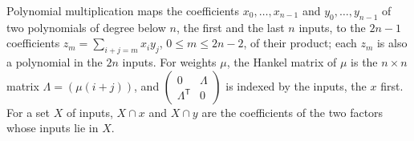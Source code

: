 \begin{definition}
  \label{def:lowerbounds-algebraic-poly-mul}
  \leanok
  Polynomial multiplication maps the coefficients $x_0,\dots,x_{n-1}$ and
  $y_0,\dots,y_{n-1}$ of two polynomials of degree below $n$, the first and
  the last $n$ inputs, to the $2n-1$ coefficients
  $z_m=\sum_{i+j=m}x_iy_j$, $0\le m\le 2n-2$, of their product; each $z_m$ is
  also a polynomial in the $2n$ inputs. For weights $\mu$, the Hankel matrix
  of $\mu$ is the $n\times n$ matrix $\Lambda=(\mu(i+j))$, and
  $\left(\begin{smallmatrix}0&\Lambda\\\Lambda^{\mathsf T}&0\end{smallmatrix}\right)$
  is indexed by the inputs, the $x$ first. For a set $X$ of inputs,
  $X\cap x$ and $X\cap y$ are the coefficients of the two factors whose
  inputs lie in $X$.
\end{definition}

